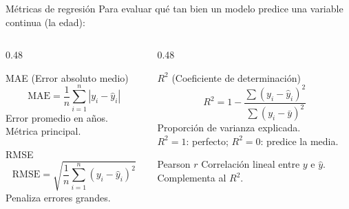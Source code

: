 \documentclass[aspectratio=169, 11pt]{beamer}
\begin{document}
\begin{frame}{Métricas de regresión}
  {\small Para evaluar qué tan bien un modelo predice una variable continua (la edad):}

  \vspace{0.2cm}
  \begin{columns}[T]
    \begin{column}{0.48\textwidth}
      \begin{block}{MAE (Error absoluto medio)}
        \[
          \text{MAE} = \frac{1}{n} \sum_{i=1}^{n} |y_i - \hat{y}_i|
        \]
        {\scriptsize Error promedio en años. Métrica principal.}
      \end{block}

      \vspace{0.2cm}
      \begin{block}{RMSE}
        \[
          \text{RMSE} = \sqrt{\frac{1}{n} \sum_{i=1}^{n} (y_i - \hat{y}_i)^2}
        \]
        {\scriptsize Penaliza errores grandes.}
      \end{block}
    \end{column}
    \begin{column}{0.48\textwidth}
      \begin{block}{$R^2$ (Coeficiente de determinación)}
        \[
          R^2 = 1 - \frac{\sum (y_i - \hat{y}_i)^2}{\sum (y_i - \bar{y})^2}
        \]
        {\scriptsize Proporción de varianza explicada.\\$R^2 = 1$: perfecto; $R^2 = 0$: predice la media.}
      \end{block}

      \vspace{0.2cm}
      \begin{block}{Pearson $r$}
        {\scriptsize Correlación lineal entre $y$ e $\hat{y}$. Complementa al $R^2$.}
      \end{block}
    \end{column}
  \end{columns}
\end{frame}
\end{document}
